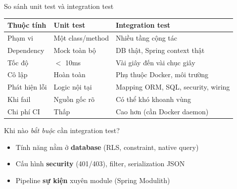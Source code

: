 \documentclass[aspectratio=169,12pt]{beamer}
\begin{document}
\begin{frame}{So sánh unit test và integration test}
  \begin{center}
  \small
  \begin{tabular}{p{3.1cm}p{4.1cm}p{5.4cm}}
    \toprule
    \textbf{Thuộc tính} & \textbf{Unit test} & \textbf{Integration test} \\
    \midrule
    Phạm vi        & Một class/method       & Nhiều tầng cộng tác \\
    Dependency     & Mock toàn bộ           & DB thật, Spring context thật \\
    Tốc độ         & $<$ 10ms               & Vài giây đến vài chục giây \\
    Cô lập         & Hoàn toàn              & Phụ thuộc Docker, môi trường \\
    Phát hiện lỗi  & Logic nội tại          & Mapping ORM, SQL, security, wiring \\
    Khi fail       & Nguồn gốc rõ            & Có thể khó khoanh vùng \\
    Chi phí CI     & Thấp                   & Cao hơn (cần Docker daemon) \\
    \bottomrule
  \end{tabular}
  \end{center}
  \vspace{-6pt}
  \begin{exampleblock}{Khi nào \emph{bắt buộc} cần integration test?}
    \begin{itemize}\small
      \item Tính năng nằm ở \textbf{database} (RLS, constraint, native query)
      \item Cấu hình \textbf{security} (401/403), filter, serialization JSON
      \item Pipeline \textbf{sự kiện} xuyên module (Spring Modulith)
    \end{itemize}
  \end{exampleblock}
\end{frame}
\end{document}
